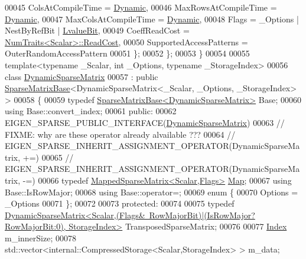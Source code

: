 \begin{DoxyCode}
00045     ColsAtCompileTime = \hyperlink{namespace_eigen_ad81fa7195215a0ce30017dfac309f0b2}{Dynamic},
00046     MaxRowsAtCompileTime = \hyperlink{namespace_eigen_ad81fa7195215a0ce30017dfac309f0b2}{Dynamic},
00047     MaxColsAtCompileTime = \hyperlink{namespace_eigen_ad81fa7195215a0ce30017dfac309f0b2}{Dynamic},
00048     Flags = \_Options | NestByRefBit | \hyperlink{group__flags_gae2c323957f20dfdc6cb8f44428eaec1a}{LvalueBit},
00049     CoeffReadCost = \hyperlink{group___core___module_struct_eigen_1_1_num_traits}{NumTraits<Scalar>::ReadCost},
00050     SupportedAccessPatterns = OuterRandomAccessPattern
00051   \};
00052 \};
00053 \}
00054 
00055 \textcolor{keyword}{template}<\textcolor{keyword}{typename} \_Scalar, \textcolor{keywordtype}{int} \_Options, \textcolor{keyword}{typename} \_StorageIndex>
00056  \textcolor{keyword}{class  }\hyperlink{class_eigen_1_1_dynamic_sparse_matrix}{DynamicSparseMatrix}
00057   : \textcolor{keyword}{public} \hyperlink{group___sparse_core___module_class_eigen_1_1_sparse_matrix_base}{SparseMatrixBase}<DynamicSparseMatrix<\_Scalar, \_Options, \_StorageIndex> >
00058 \{
00059     \textcolor{keyword}{typedef} \hyperlink{group___sparse_core___module_class_eigen_1_1_sparse_matrix_base}{SparseMatrixBase<DynamicSparseMatrix>} Base;
00060     \textcolor{keyword}{using} Base::convert\_index;
00061   \textcolor{keyword}{public}:
00062     EIGEN\_SPARSE\_PUBLIC\_INTERFACE(\hyperlink{class_eigen_1_1_dynamic_sparse_matrix}{DynamicSparseMatrix})
00063     \textcolor{comment}{// FIXME: why are these operator already alvailable ???}
00064     \textcolor{comment}{// EIGEN\_SPARSE\_INHERIT\_ASSIGNMENT\_OPERATOR(DynamicSparseMatrix, +=)}
00065     \textcolor{comment}{// EIGEN\_SPARSE\_INHERIT\_ASSIGNMENT\_OPERATOR(DynamicSparseMatrix, -=)}
00066     \textcolor{keyword}{typedef} \hyperlink{class_eigen_1_1_mapped_sparse_matrix}{MappedSparseMatrix<Scalar,Flags>} \hyperlink{group___core___module_class_eigen_1_1_map}{Map};
00067     \textcolor{keyword}{using} Base::IsRowMajor;
00068     \textcolor{keyword}{using} Base::operator=;
00069     \textcolor{keyword}{enum} \{
00070       Options = \_Options
00071     \};
00072 
00073   \textcolor{keyword}{protected}:
00074 
00075     \textcolor{keyword}{typedef} 
      \hyperlink{class_eigen_1_1_dynamic_sparse_matrix}{DynamicSparseMatrix<Scalar,(Flags&~RowMajorBit)|(IsRowMajor?RowMajorBit:0), StorageIndex>}
       TransposedSparseMatrix;
00076 
00077     \hyperlink{namespace_eigen_a62e77e0933482dafde8fe197d9a2cfde}{Index} m\_innerSize;
00078     std::vector<internal::CompressedStorage<Scalar,StorageIndex> > m\_data;

\end{DoxyCode}
